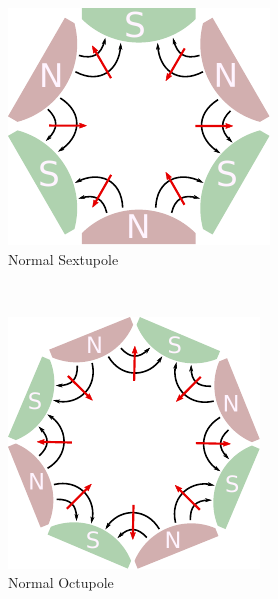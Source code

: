 \begin{figure}[!htb]
    \begin{subfigure}{0.243\textwidth}
        \includegraphics[height=\magnetheight]{images/magnets/sextupole_normal.pdf}
        \caption{
           Normal Sextupole 
        }
        \label{fig:MSNorm}
    \end{subfigure}
    \\
    \vspace{1em}
    \begin{subfigure}{0.243\textwidth}
        \includegraphics[height=\magnetheight]{images/magnets/octupole_normal.pdf}
        \caption{
           Normal Octupole 
        }
        \label{fig:MONorm}
    \end{subfigure}
    \begin{subfigure}{0.243\textwidth}

\end{subfigure}
\end{figure}
